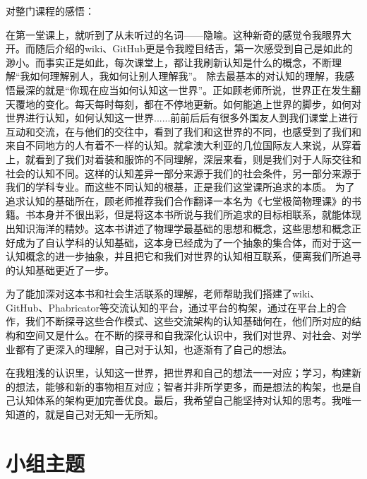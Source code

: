 \documentclass[11pt,fleqn]{book}
\numberwithin{dummy}{section}
\theoremstyle{ocrenumbox}
\theoremstyle{blacknumex}
\theoremstyle{blacknumbox}
\theoremstyle{ocrenum}
\newenvironment{remark}[1]{\par\vspace{10pt}\small %
	\begin{list}{}{
			\leftmargin=35pt %
			\rightmargin=25pt}\item\ignorespaces %
		\makebox[-2.5pt]{\begin{tikzpicture}[overlay]
			\node[draw=ocre!60,line width=1pt,circle,fill=ocre!25,font=\sffamily\bfseries,inner sep=2pt,outer sep=0pt] at (-15pt,0pt){\textcolor{ocre}{#1}};\end{tikzpicture}} %
		\advance\baselineskip -1pt}{\end{list}\vskip5pt} %
\newlength\esp
\newif\ifusechapterimage
\newcommand{\thechapterimage}{}%
\newcommand{\chapterimage}[1]{\ifusechapterimage\renewcommand{\thechapterimage}{#1}\fi}%
\begin{document}
\begin{remark}{樊}
对整门课程的感悟：
    
       在第一堂课上，就听到了从未听过的名词——隐喻。这种新奇的感觉令我眼界大开。而随后介绍的wiki、GitHub更是令我瞠目结舌，第一次感受到自己是如此的渺小。而事实正是如此，每次课堂上，都让我刷新认知是什么的概念，不断理解“我如何理解别人，我如何让别人理解我”。
除去最基本的对认知的理解，我感悟最深的就是“你现在应当如何认知这一世界”。正如顾老师所说，世界正在发生翻天覆地的变化。每天每时每刻，都在不停地更新。如何能追上世界的脚步，如何对世界进行认知，如何认知这一世界......前前后后有很多外国友人到我们课堂上进行互动和交流，在与他们的交往中，看到了我们和这世界的不同，也感受到了我们和来自不同地方的人有着不一样的认知。就拿澳大利亚的几位国际友人来说，从穿着上，就看到了我们对着装和服饰的不同理解，深层来看，则是我们对于人际交往和社会的认知不同。这样的认知差异一部分来源于我们的社会条件，另一部分来源于我们的学科专业。而这些不同认知的根基，正是我们这堂课所追求的本质。
为了追求认知的基础所在，顾老师推荐我们合作翻译一本名为《七堂极简物理课》的书籍。书本身并不很出彩，但是将这本书所说与我们所追求的目标相联系，就能体现出知识海洋的精妙。这本书讲述了物理学最基础的思想和概念，这些思想和概念正好成为了自认学科的认知基础，这本身已经成为了一个抽象的集合体，而对于这一认知概念的进一步抽象，并且把它和我们对世界的认知相互联系，便离我们所追寻的认知基础更近了一步。
     
        为了能加深对这本书和社会生活联系的理解，老师帮助我们搭建了wiki、GitHub、Phabricator等交流认知的平台，通过平台的构架，通过在平台上的合作，我们不断探寻这些合作模式、这些交流架构的认知基础何在，他们所对应的结构和空间又是什么。在不断的探寻和自我深化认识中，我们对世界、对社会、对学业都有了更深入的理解，自己对于认知，也逐渐有了自己的想法。
     
        在我粗浅的认识里，认知这一世界，把世界和自己的想法一一对应；学习，构建新的想法，能够和新的事物相互对应；智者并非所学更多，而是想法的构架，也是自己认知体系的架构更加完善优良。最后，我希望自己能坚持对认知的思考。我唯一知道的，就是自己对无知一无所知。
\end{remark}



\chapterimage{chapter_head_1.pdf} %

\chapter{小组主题}
\end{document}

